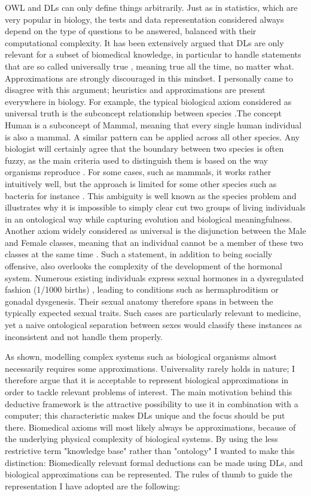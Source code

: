 OWL and DLs can only define things arbitrarily. Just as in statistics, which are very popular in biology, the tests and data representation considered always depend on the type of questions to be answered, balanced with their computational complexity. It has been extensively argued that DLs are only relevant for a subset of biomedical knowledge, in particular to handle statements that are so called universally true \citep{schulz2013formal}, meaning true all the time, no matter what. Approximations are strongly discouraged in this mindset. I personally came to disagree with this argument; heuristics and approximations are present everywhere in biology. For example, the typical biological axiom considered as universal truth is the subconcept relationship between species \citep{schulz2013formal} \citep{krotzsch2012owl}.The concept Human is a subconcept of Mammal, meaning that every single human individual is also a mammal. A similar pattern can be applied across all other species. Any biologist will certainly agree that the boundary between two species is often fuzzy, as the main criteria used to distinguish them is based on the way organisms reproduce \citep{hanage2013fuzzy}. For some cases, such as mammals, it works rather intuitively well, but the approach is limited for some other species such as bacteria for instance \citep{hanage2013fuzzy}. This ambiguity is well known as the species problem and illustrates why it is impossible to simply clear cut two groups of living individuals in an ontological way while capturing evolution and biological meaningfulness. Another axiom widely considered as universal is the disjunction between the Male and Female classes, meaning that an individual cannot be a member of these two classes at the same time \citep{disjointw3c}. Such a statement, in addition to being socially offensive, also overlooks the complexity of the development of the hormonal system. Numerous existing individuals express sexual hormones in a dysregulated fashion (1/1000 births) \citep{dreger1998ambiguous}, leading to conditions such as hermaphroditism or gonadal dysgenesis. Their sexual anatomy therefore spans in between the typically expected sexual traits. Such cases are particularly relevant to medicine, yet a naive ontological separation between sexes would classify these instances as inconsistent and not handle them properly.

As shown, modelling complex systems such as biological organisms almost necessarily requires some approximations. Universality rarely holds in nature; I therefore argue that it is acceptable to represent biological approximations in order to tackle relevant problems of interest. The main motivation behind this deductive framework is the attractive possibility to use it in combination with a computer; this characteristic makes DLs unique and the focus should be put there. Biomedical axioms will most likely always be approximations, because of the underlying physical complexity of biological systems. By using the less restrictive term "knowledge base" rather than "ontology" I wanted to make this distinction: Biomedically relevant formal deductions can be made using DLs, and biological approximations can be represented. The rules of thumb to guide the representation I have adopted are the following:

